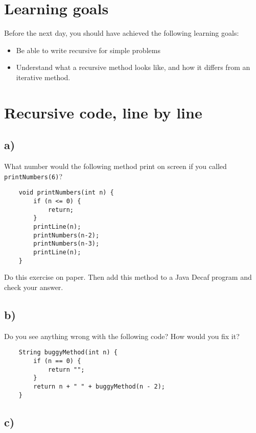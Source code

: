 \documentclass{article}
\begin{document}
\section*{Learning goals}
\label{sec:learning-goals}

Before the next day, you should have achieved the following learning
goals: 

\begin{itemize}
\item Be able to write recursive for simple problems
\item Understand what a recursive method looks like, and how it
  differs from an iterative method. 
\end{itemize}

\section{Recursive code, line by line}
\label{sec:read-recurs-code}

\subsection*{a)}

What number would the following method print on screen if you called
\verb+printNumbers(6)+?

\begin{verbatim}
    void printNumbers(int n) {
        if (n <= 0) {
            return;
        }
        printLine(n);
        printNumbers(n-2);
        printNumbers(n-3);
        printLine(n);
    }
\end{verbatim}

Do this exercise on paper. Then add this method to a Java Decaf
program and check your answer. 

\subsection*{b)}
\label{sec:b-1}

Do you see anything wrong with the following code? How would you fix it?

\begin{verbatim}
    String buggyMethod(int n) {
        if (n == 0) {
            return "";
        }
        return n + " " + buggyMethod(n - 2);
    }
\end{verbatim}

\subsection*{c)}
\label{sec:b-3}
\end{document}
